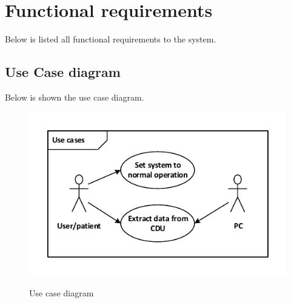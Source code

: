 
\section{Functional requirements}
Below is listed all functional requirements to the system.\\

\subsection{Use Case diagram}
Below is shown the use case diagram.\\

\begin{figure}[H]
\centering
\includegraphics*[width=.7\textwidth]{billeder/UseCase_vector}
\label{usecase_fig}
\caption{Use case diagram}
\end{figure}

